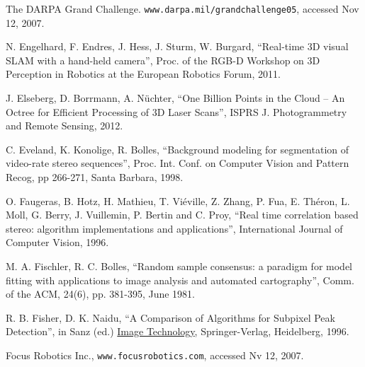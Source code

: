 \documentclass[twocolumn,oneside]{book}
\begin{document}
\begin{thebibliography}{99}


The DARPA Grand Challenge.
\verb+www.darpa.mil/grandchallenge05+, accessed Nov 12, 2007.

N. Engelhard, F. Endres, J. Hess, J. Sturm, W. Burgard,
``Real-time 3D visual SLAM with a hand-held camera'',
Proc. of the RGB-D Workshop on 3D Perception in Robotics at the
European Robotics Forum, 2011.

J. Elseberg, D. Borrmann, A. N{\"u}chter,
``One Billion Points in the Cloud -- An Octree for Efficient Processing of 3D Laser Scans'',
ISPRS J. Photogrammetry and Remote Sensing, 2012.

C. Eveland, K. Konolige, R. Bolles,
``Background modeling for segmentation of video-rate stereo sequences'',
Proc. Int. Conf. on Computer Vision and Pattern Recog, pp 266-271, Santa Barbara, 1998.

O. Faugeras, B. Hotz, H. Mathieu, T. Vi\'eville, Z. Zhang, P. Fua,
E. Th\'eron, L. Moll, G. Berry, J. Vuillemin, P. Bertin and C. Proy,
``Real time correlation based stereo: algorithm implementations and applications'',
International Journal of Computer Vision, 1996.

M. A. Fischler, R. C. Bolles,
``Random sample consensus: a paradigm for model fitting with applications to
image analysis and automated cartography'',
Comm. of the ACM, 24(6), pp. 381-395, June 1981. 

R. B. Fisher, D. K. Naidu,  
``A Comparison of Algorithms for Subpixel Peak Detection'',
in Sanz (ed.) {\underline {Image Technology}},
Springer-Verlag, Heidelberg, 1996.


Focus Robotics Inc.,
\verb+www.focusrobotics.com+, accessed Nv 12, 2007.


\end{thebibliography}
\end{document}
